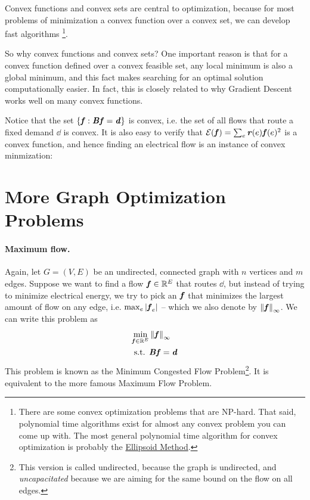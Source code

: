 Convex functions and convex sets are central to optimization,
because for most problems of minimization a convex function over a
convex set, we can develop fast algorithms \footnote{
 There are some convex optimization problems that are NP-hard.
  That said, polynomial time algorithms exist for almost any convex
  problem you can come up with.
  The most general polynomial time algorithm for convex optimization
  is probably the
  \href{https://en.wikipedia.org/wiki/Ellipsoid_method}{Ellipsoid Method}.
}.


So why convex functions and convex sets?
One important reason is that
for a convex function defined over a convex feasible set,
any local minimum is also a global minimum,
and this fact makes searching for an optimal solution
computationally easier.
In fact, this is closely related to why Gradient Descent works well
on many convex functions.


Notice that the set $\left\{ \boldsymbol{\mathit{f}}: \boldsymbol{\mathit{B}} \boldsymbol{\mathit{f}} = \boldsymbol{\mathit{d}} \right\}$ is convex, i.e. the
set of all flows that route a fixed demand $\dd$ is convex.
It is also easy to verify that $\mathcal{E}(\boldsymbol{\mathit{f}}) = \sum_e \boldsymbol{\mathit{r}}(e) \boldsymbol{\mathit{f}}(e)^2$
is a convex function, and hence finding an electrical flow is an
instance of convex minmization:



\section{More Graph Optimization Problems}

\paragraph{Maximum flow.}
Again, let $G=(V,E)$ be an undirected, connected graph with $n$
vertices and $m$ edges.
Suppose we want to find a flow
$\boldsymbol{\mathit{f}} \in \mathbb{R}^E$ that routes $\dd$, but instead of trying to minimize
electrical energy, we try to pick an $\boldsymbol{\mathit{f}}$ that minimizes the largest
amount of flow on any edge, i.e. $\max_e \left|\boldsymbol{\mathit{f}}_e \right|$  -- which we
also denote by $\left\| \boldsymbol{\mathit{f}} \right\|_{\infty}$.
We can write this problem as
\begin{align*}
\min_{\boldsymbol{\mathit{f}} \in \mathbb{R}^E } & \left\| \boldsymbol{\mathit{f}} \right\|_{\infty} \\
\textrm{s.t. } & \boldsymbol{\mathit{B}} \boldsymbol{\mathit{f}} = \boldsymbol{\mathit{d}}
\end{align*}
This problem is known as the Minimum Congested Flow Problem\footnote{This
  version is called undirected, because the graph is undirected, and
  \emph{uncapacitated} because we are aiming for the same
  bound on the flow on all edges.}.
It is equivalent to the more famous Maximum Flow Problem.

